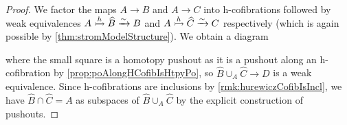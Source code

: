 \begin{prop}
\begin{proof}
        We factor the maps $A\to B$ and $A\to C$ into h-cofibrations followed by weak equivalences $A\xtailrightarrow{h}\widehat{B}\xrightarrow{\sim} B$ and $A\xtailrightarrow{h}\widehat{C}\xrightarrow{\sim} C$ respectively (which is again possible by \cref{thm:stromModelStructure}).
        We obtain a diagram
        \begin{center}
        \end{center}
        where the small square is a homotopy pushout as it is a pushout along an h-cofibration by \cref{prop:poAlongHCofibIsHtpyPo}, so $\widehat{B}\cup_A\widehat{C}\to D$ is a weak equivalence.
        Since h-cofibrations are inclusions by \cref{rmk:hurewiczCofibIsIncl}, we have $\widehat{B}\cap\widehat{C}=A$ as subspaces of $\widehat{B}\cup_A\widehat{C}$ by the explicit construction of pushouts.


\end{proof}
\end{prop}
